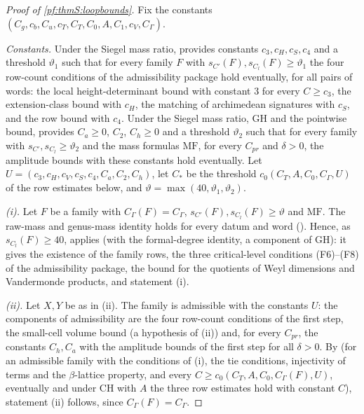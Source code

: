 \begin{proof}[Proof of \cref{pf:thmS:loopbounds}]
Fix the constants $(C_g,c_b,C_u,c_T,C_T,C_0,A,C_1,c_V,C_\Gamma)$.

\emph{Constants.} Under the Siegel mass ratio,  provides constants
$c_3,c_H,c_S,c_4$ and a threshold $\vartheta_1$ such that for every family $F$ with $s_{C'}(F),s_{C_l}(F)\ge\vartheta_1$ the four
row-count conditions of the admissibility package hold eventually, for all pairs of words: the local height-determinant bound
with constant $3$ for every $C\ge c_3$, the extension-class bound with $c_H$, the matching of archimedean signatures with $c_S$,
and the row bound with $c_4$. Under the Siegel mass ratio, $\mathrm{GH}$ and the pointwise bound,
 provides $C_a\ge0$, $C_2$, $C_h\ge0$ and a threshold
$\vartheta_2$ such that for every family with $s_{C'},s_{C_l}\ge\vartheta_2$ and the mass formulas $\mathrm{MF}$, for every $C_{pr}$
and $\delta>0$, the amplitude bounds with these constants hold eventually. Let $U=(c_3,c_H,c_V,c_S,c_4,C_a,C_2,C_h)$, let $C_*$
be the threshold $c_0(C_T,A,C_0,C_\Gamma,U)$ of the row estimates below, and $\vartheta=\max(40,\vartheta_1,\vartheta_2)$.

\emph{(i).} Let $F$ be a family with $C_\Gamma(F)=C_\Gamma$, $s_{C'}(F),s_{C_l}(F)\ge\vartheta$ and $\mathrm{MF}$. The raw-mass and
genus-mass identity holds for every datum and word (). Hence, as
$s_{C_l}(F)\ge40$,  applies (with the formal-degree identity, a component of
$\mathrm{GH}$): it gives the existence of the family rows, the three critical-level conditions (F6)--(F8) of the admissibility
package, the bound for the quotients of Weyl dimensions and Vandermonde products, and statement (i).

\emph{(ii).} Let $X,Y$ be as in (ii). The family is admissible with the constants $U$: the components of admissibility are the
four row-count conditions of the first step, the small-cell volume bound (a hypothesis of (ii)) and, for every $C_{pr}$, the
constants $C_h,C_a$ with the amplitude bounds of the first step for all $\delta>0$. By
 (for an admissible family with the conditions of (i), the tie
conditions, injectivity of terms and the $\beta$-lattice property, and every $C\ge c_0(C_T,A,C_0,C_\Gamma(F),U)$, eventually and
under $\mathrm{CH}$ with $A$ the three row estimates hold with constant $C$), statement (ii) follows, since $C_\Gamma(F)=C_\Gamma$.
\end{proof}

